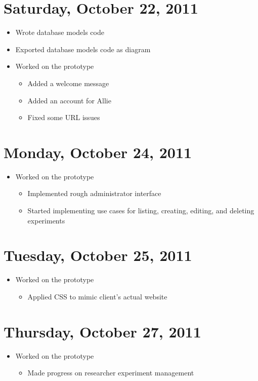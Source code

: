 \documentclass{article}
\begin{document}
\section{Saturday, October 22, 2011}
\begin{itemize}
\item Wrote database models code
\item Exported database models code as diagram
\item Worked on the prototype
    \begin{itemize}
    \item Added a welcome message
    \item Added an account for Allie
    \item Fixed some URL issues
    \end{itemize}
\end{itemize}

\section{Monday, October 24, 2011}
\begin{itemize}
\item Worked on the prototype
    \begin{itemize}
    \item Implemented rough administrator interface
    \item Started implementing use cases for listing, creating, editing, and deleting experiments
    \end{itemize}
\end{itemize}

\section{Tuesday, October 25, 2011}
\begin{itemize}
\item Worked on the prototype
    \begin{itemize}
    \item Applied CSS to mimic client's actual website
    \end{itemize}
\end{itemize}

\section{Thursday, October 27, 2011}
\begin{itemize}
\item Worked on the prototype
    \begin{itemize}
    \item Made progress on researcher experiment management
    \end{itemize}
\end{itemize}
\end{document}
